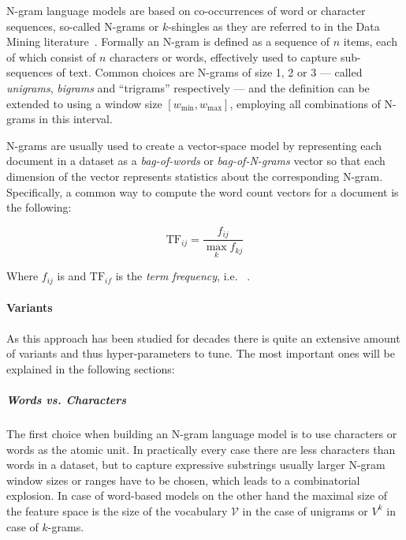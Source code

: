 
N-gram language models are based on co-occurrences of word or character sequences, so-called N-grams or $k$-shingles as they are referred to in the Data Mining literature~\cite[Chapter 3.2, p.~72]{Leskovec:2014aa}. Formally an N-gram is defined as a sequence of $n$ items, each of which consist of $n$ characters or words, effectively used to capture sub-sequences of text. Common choices are N-grams of size 1, 2 or 3 --- called \emph{unigrams}, \emph{bigrams} and ``trigrams'' respectively --- and the definition can be extended to using a window size $[\textit{w}_{\text{min}}, \textit{w}_{\text{max}}]$, employing all combinations of N-grams in this interval.

N-grams are usually used to create a vector-space model by representing each document in a dataset as a \textit{bag-of-words} or \textit{bag-of-N-grams} vector so that each dimension of the vector represents statistics about the corresponding N-gram. Specifically, a common way to compute the word count vectors for a document is the following:

\begin{equation}
  \text{TF}_{ij} = \frac{f_{ij}}{\max_k f_{kj}}
\end{equation}

Where $f_{ij}$ is  and $\text{TF}_{if}$ is the \emph{term frequency}, i.e.   ~\cite[Chapter 1.3.1, p.~8]{Leskovec:2014aa}.


\paragraph{Variants}

As this approach has been studied for decades  there is quite an extensive amount of variants and thus hyper-parameters to tune. The most important ones will be explained in the following sections:

\subparagraph{Words vs. Characters} The first choice when building an N-gram language model is to use characters or words as the atomic unit. In practically every case there are less characters than words in a dataset, but to capture expressive substrings usually larger N-gram window sizes or ranges have to be chosen, which leads to a combinatorial explosion. In case of word-based models on the other hand the maximal size of the feature space is the size of the vocabulary $\mathcal{V}$ in the case of unigrams or $V^k$ in case of $k$-grams.

